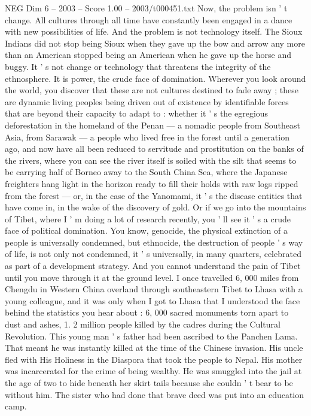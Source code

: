 \begin{textsample}{NEG Dim 6 – 2003 – Score 1.00 – 2003/t000451.txt}
Now, the problem isn ' t change.
All cultures through all time have constantly been engaged in a dance with new possibilities of life.
And the problem is not technology itself.
The Sioux Indians did not stop being Sioux when they gave up the bow and arrow any more than an American stopped being an American when he gave up the horse and buggy.
It ' s not change or technology that threatens the integrity of the ethnosphere.
It is power, the crude face of domination.
Wherever you look around the world, you discover that these are not cultures destined to fade away ; these are dynamic living peoples being driven out of existence by identifiable forces that are beyond their capacity to adapt to : whether it ' s the egregious deforestation in the homeland of the Penan — a nomadic people from Southeast Asia, from Sarawak — a people who lived free in the forest until a generation ago, and now have all been reduced to servitude and prostitution on the banks of the rivers, where you can see the river itself is soiled with the silt that seems to be carrying half of Borneo away to the South China Sea, where the Japanese freighters hang light in the horizon ready to fill their holds with raw logs ripped from the forest — or, in the case of the Yanomami, it ' s the disease entities that have come in, in the wake of the discovery of gold.
Or if we go into the mountains of Tibet, where I ' m doing a lot of research recently, you ' ll see it ' s a crude face of political domination.
You know, genocide, the physical extinction of a people is universally condemned, but ethnocide, the destruction of people ' s way of life, is not only not condemned, it ' s universally, in many quarters, celebrated as part of a development strategy.
And you cannot understand the pain of Tibet until you move through it at the ground level.
I once travelled 6, 000 miles from Chengdu in Western China overland through southeastern Tibet to Lhasa with a young colleague, and it was only when I got to Lhasa that I understood the face behind the statistics you hear about : 6, 000 sacred monuments torn apart to dust and ashes, 1. 2 million people killed by the cadres during the Cultural Revolution.
This young man ' s father had been ascribed to the Panchen Lama.
That meant he was instantly killed at the time of the Chinese invasion.
His uncle fled with His Holiness in the Diaspora that took the people to Nepal.
His mother was incarcerated for the crime of being wealthy.
He was smuggled into the jail at the age of two to hide beneath her skirt tails because she couldn ' t bear to be without him.
The sister who had done that brave deed was put into an education camp.

\end{textsample}
